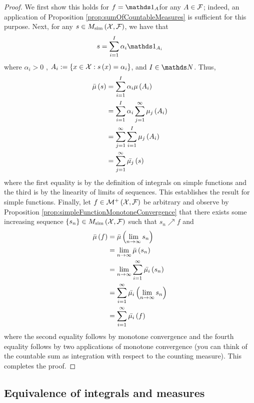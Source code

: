 \begin{proof}
We first show this holds for $f=\indicate_{A}$for any $A\in\mathcal{F}$;
indeed, an application of Proposition \ref{prop:sumOfCountableMeasures}
is sufficient for this purpose. Next, for any $s\in M_{\textnormal{sim}}\left(\mathcal{X},\mathcal{F}\right)$,
we have that
\[
s=\sum_{i=1}^{I}\alpha_{i}\indicate_{A_{i}}
\]
where $\alpha_{i}>0$ , $A_{i}:=\left\{ x\in\mathcal{X}:s\left(x\right)=\alpha_{i}\right\} $,
and $I\in\N$. Thus,
\begin{align*}
\bar{\mu}\left(s\right) & =\sum_{i=1}^{I}\alpha_{i}\mu\left(A_{i}\right)\\
 & =\sum_{i=1}^{I}\alpha_{i}\sum_{j=1}^{\infty}\mu_{j}\left(A_{i}\right)\\
 & =\sum_{j=1}^{\infty}\sum_{i=1}^{I}\mu_{j}\left(A_{i}\right)\\
 & =\sum_{j=1}^{\infty}\bar{\mu_{j}}\left(s\right)
\end{align*}
where the first equality is by the definition of integrals on simple
functions and the third is by the linearity of limits of sequences.
This establishes the result for simple functions. Finally, let $f\in\mathcal{M}^{+}\left(\mathcal{X},\mathcal{F}\right)$
be arbitrary and observe by Proposition \ref{prop:simpleFunctionMonotoneConvergence}
that there exists some increasing sequence $\left\{ s_{n}\right\} \in M_{\textnormal{sim}}\left(\mathcal{X},\mathcal{F}\right)$
such that $s_{n}\nearrow f$ and 
\begin{align*}
\bar{\mu}\left(f\right) & =\bar{\mu}\left(\lim_{n\to\infty}s_{n}\right)\\
 & =\lim_{n\to\infty}\bar{\mu}\left(s_{n}\right)\\
 & =\lim_{n\to\infty}\sum_{i=1}^{\infty}\bar{\mu_{i}}\left(s_{n}\right)\\
 & =\sum_{i=1}^{\infty}\bar{\mu_{i}}\left(\lim_{n\to\infty}s_{n}\right)\\
 & =\sum_{i=1}^{\infty}\bar{\mu_{i}}\left(f\right)
\end{align*}
where the second equality follows by monotone convergence and the
fourth equality follows by two applications of monotone convergence
(you can think of the countable sum as integration with respect to
the counting measure). This completes the proof.
\end{proof}


\subsection{Equivalence of integrals and measures}

